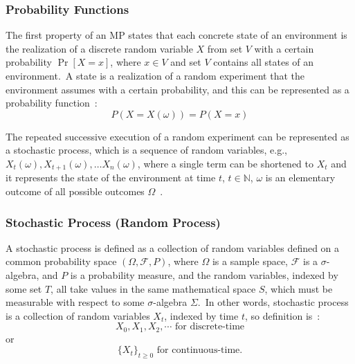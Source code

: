 \documentclass[../xlapes02]{subfiles}
\begin{document}
    \subsubsection{Probability Functions}\label{subsubsec:probability-functions}
    The first property of an MP states that each concrete state of an environment is the realization of a discrete random variable $X$ from set $V$ with a certain probability $\Pr\left[X=x\right]$, where $x \in V$ and set $V$ contains all states of an environment.\ A state is a realization of a random experiment that the environment assumes with a certain probability, and this can be represented as a probability function~\cite{FITMT25127}:
    \begin{equation}
        \label{eq:probability-function}
        P(X = X(\omega)) = P(X = x)
    \end{equation}

    The repeated successive execution of a random experiment can be represented as a stochastic process, which is a sequence of random variables, e.g., $X_t(\omega), X_{t+1}(\omega), \ldots X_n(\omega)$, where a single term can be shortened to $X_t$ and it represents the state of the environment at time $t$, $t\in\mathbb{N}$, $\omega$ is an elementary outcome of all possible outcomes $\Omega$~\cite{inproceedings, rao2022foundations}.

    \subsubsection{Stochastic Process (Random Process)}\label{subsubsec:stochastic-process}
    A stochastic process is defined as a collection of random variables defined on a common probability space $(\Omega, \mathcal{F}, P)$, where $\Omega$ is a sample space, $\mathcal{F}$ is a $\sigma$-algebra, and $P$ is a probability measure, and the random variables, indexed by some set $T$, all take values in the same mathematical space $S$, which must be measurable with respect to some $\sigma$-algebra $\Sigma$.\ In other words, stochastic process is a collection of random variables $X_t$, indexed by time $t$, so definition is~\cite{enwiki:1148510872}:
    \begin{equation}
        \label{eq:stochastic-process}
        X_0, X_1, X_2,\cdots \text{ for discrete-time}
    \end{equation}
    or
    \begin{equation}
        \label{eq:stochastic-process-continuous}
        \{X_t\}_{t\geq0} \text{ for continuous-time.}
    \end{equation}
\end{document}
